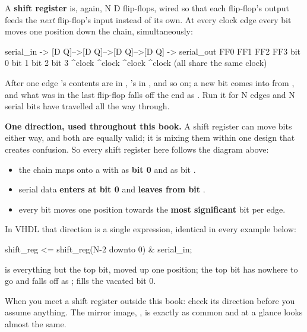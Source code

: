 A \textbf{shift register} is, again, N D flip-flops, wired so that each flip-flop's output feeds the
\emph{next} flip-flop's input instead of its own. At every clock edge every bit moves one position
down the chain, simultaneously:

\begin{textdrawing}
serial_in -> [D Q]-->[D Q]-->[D Q]-->[D Q] -> serial_out
              FF0     FF1     FF2     FF3
             bit 0   bit 1   bit 2   bit 3
              ^clock  ^clock  ^clock  ^clock   (all share the same clock)
\end{textdrawing}

After one edge 's contents are in , 's in , and so on; a new
bit comes into  from , and what was in the last flip-flop falls off the end
as . Run it for N edges and N serial bits have travelled all the way through.

\textbf{One direction, used throughout this book.} A shift register can move bits either way, and
both are equally valid; it is mixing them within one design that creates confusion. So every shift
register here follows the diagram above:
\begin{itemize}
  \item the chain maps onto a  with  as \textbf{bit 0} and
     as bit .
  \item serial data \textbf{enters at bit 0} and \textbf{leaves from bit }.
  \item every bit moves one position towards the \textbf{most significant} bit per edge.
\end{itemize}

In VHDL that direction is a single expression, identical in every example below:

\begin{vhdlcode}
shift_reg <= shift_reg(N-2 downto 0) & serial_in;
\end{vhdlcode}

 is everything but the top bit, moved up one position; the top bit has
nowhere to go and falls off as ;  fills the vacated bit 0.

When you meet a shift register outside this book: check its direction before you assume anything.
The mirror image, , is exactly as common and at a glance
looks almost the same.


